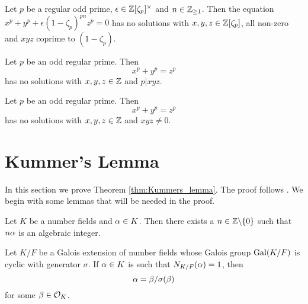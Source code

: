 \begin{theorem}\label{thm:gen_flt_eqn}
	Let $p$ be a regular odd prime, $\epsilon \in \mathbb{Z}[\zeta_p]^\times$ and $n \in \mathbb{Z}_{\geq 1}$. Then the equation $x^p+y^p+\epsilon(1-\zeta_p)^{pn}z^p=0$ has no solutions with $x,y,z \in \mathbb{Z}[\zeta_p]$, all non-zero and $xyz$ coprime to $(1-\zeta_p)$.
\end{theorem}

\begin{theorem}\label{theorem:FLT_case_two}
	\leanok
	Let $p$ be an odd regular prime. Then \[x^p+y^p=z^p\] has no solutions with $x,y,z \in \mathbb{Z}$ and $p | xyz$.
\end{theorem}


\begin{theorem}\label{FLT_regular}
	\leanok
	Let $p$ be an odd regular prime.  Then \[x^p+y^p=z^p\] has no solutions with $x,y,z \in \mathbb{Z}$ and $xyz \ne 0$.
\end{theorem}

\section{Kummer's Lemma}

In this section we prove Theorem \ref{thm:Kummers_lemma}. The proof follows \cite{SD}. We begin with some lemmas that will be needed in the proof.


\begin{lemma}\label{lem:exists_alg_int}
	Let $K$ be a number fields and $\alpha \in K$. Then there exists a $n \in \mathbb{Z}\backslash\{0\}$ such that $n \alpha$ is an algebraic integer.
\end{lemma}

\begin{theorem}[Hilbert 90]\label{Hilbert90}
Let $K/F$ be a Galois extension of number fields whose Galois group $\operatorname{Gal}(K/F)$ is cyclic with generator $\sigma$. If $\alpha \in K$ is such that $N_{K/F}(\alpha)=1$, then \[ \alpha =\beta/ \sigma(\beta)\] for some $\beta \in \mathcal{O}_K$.

\end{theorem}

